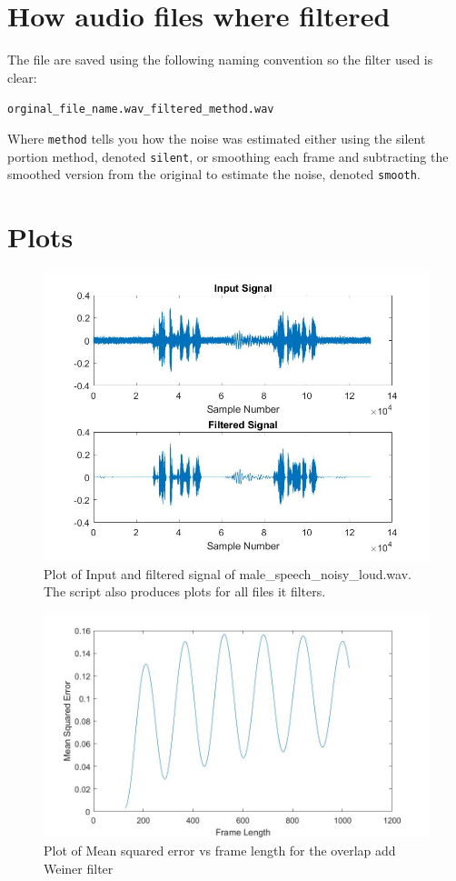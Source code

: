 \documentclass[11pt]{article}
\begin{document}
\appendix

\section{How audio files where filtered}
The file are saved using the following naming convention so the filter used is clear:

{\centering
\texttt{orginal\_file\_name.wav\_filtered\_method.wav} \par}

Where \texttt{method} tells you how the noise was estimated either using the silent portion method, denoted \texttt{silent}, or smoothing each frame and subtracting the smoothed version from the original to estimate the noise, denoted \texttt{smooth}.

\section{Plots}

\begin{figure} [H]
\centering	\includegraphics[scale = 0.4]
{male_loud_filter}
\caption{Plot of Input and filtered signal of male\_speech\_noisy\_loud.wav. The script also produces plots for all files it filters.}
\label{man_soft}
\end{figure}

\begin{figure} [H]
\centering	\includegraphics[scale = 0.4]
{MSE_Framelength}
\caption{Plot of Mean squared error vs frame length for the overlap add Weiner filter}
\label{MSE}
\end{figure}
\end{document}

